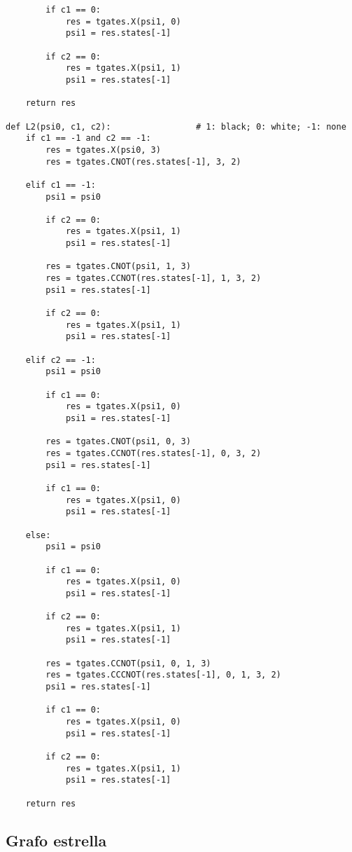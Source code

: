 \begin{verbatim}
        if c1 == 0:
            res = tgates.X(psi1, 0)
            psi1 = res.states[-1]

        if c2 == 0:
            res = tgates.X(psi1, 1)
            psi1 = res.states[-1]

    return res

def L2(psi0, c1, c2):                 # 1: black; 0: white; -1: none
    if c1 == -1 and c2 == -1:
        res = tgates.X(psi0, 3)
        res = tgates.CNOT(res.states[-1], 3, 2)

    elif c1 == -1:
        psi1 = psi0

        if c2 == 0:
            res = tgates.X(psi1, 1)
            psi1 = res.states[-1]

        res = tgates.CNOT(psi1, 1, 3)
        res = tgates.CCNOT(res.states[-1], 1, 3, 2)
        psi1 = res.states[-1]

        if c2 == 0:
            res = tgates.X(psi1, 1)
            psi1 = res.states[-1]

    elif c2 == -1:
        psi1 = psi0

        if c1 == 0:
            res = tgates.X(psi1, 0)
            psi1 = res.states[-1]

        res = tgates.CNOT(psi1, 0, 3)
        res = tgates.CCNOT(res.states[-1], 0, 3, 2)
        psi1 = res.states[-1]

        if c1 == 0:
            res = tgates.X(psi1, 0)
            psi1 = res.states[-1]

    else:
        psi1 = psi0

        if c1 == 0:
            res = tgates.X(psi1, 0)
            psi1 = res.states[-1]

        if c2 == 0:
            res = tgates.X(psi1, 1)
            psi1 = res.states[-1]

        res = tgates.CCNOT(psi1, 0, 1, 3)
        res = tgates.CCCNOT(res.states[-1], 0, 1, 3, 2)
        psi1 = res.states[-1]

        if c1 == 0:
            res = tgates.X(psi1, 0)
            psi1 = res.states[-1]

        if c2 == 0:
            res = tgates.X(psi1, 1)
            psi1 = res.states[-1]

    return res

\end{verbatim}

\subsection{Grafo estrella}

